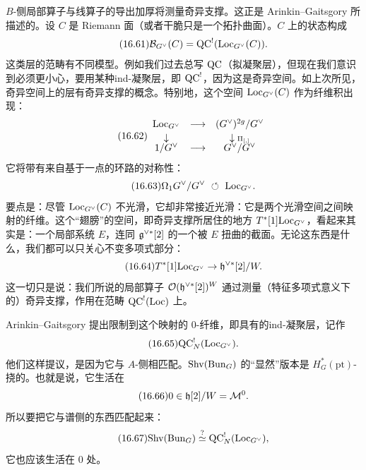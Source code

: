 $B$-侧局部算子与线算子的导出加厚将测量奇异支撑。这正是 Arinkin--Gaitsgory 所描述的。设 $C$ 是 Riemann 面（或者干脆只是一个拓扑曲面）。$C$ 上的状态构成
\begin{equation}\tag{16.61}
\mathcal{B}_{G^\vee}(C)=\mathrm{QC}^!(\mathrm{Loc}_{G^\vee}(C)).
\end{equation}
这类层的范畴有不同模型。例如我们过去总写 $\mathrm{QC}$（拟凝聚层），但现在我们意识到必须更小心，要用某种ind-凝聚层，即 $\mathrm{QC}^!$，因为这是奇异空间。如上次所见，奇异空间上的层有奇异支撑的概念。特别地，这个空间 $\mathrm{Loc}_{G^\vee}(C)$ 作为纤维积出现：
\begin{equation}\tag{16.62}
\begin{array}{ccc}
\mathrm{Loc}_{G^\vee} & \longrightarrow & (G^\vee)^{2g}/G^\vee\\[2pt]
\downarrow & & \downarrow{\scriptstyle\Pi_{[,]}}\\[-2pt]
1/G^\vee & \longrightarrow & G^\vee/G^\vee
\end{array}
\end{equation}
它将带有来自基于一点的环路的对称性：
\begin{equation}\tag{16.63}
\Omega_1G^\vee/G^\vee\ \circlearrowleft\ \mathrm{Loc}_{G^\vee}.
\end{equation}
要点是：尽管 $\mathrm{Loc}_{G^\vee}(C)$ 不光滑，它却非常接近光滑：它是两个光滑空间之间映射的纤维。这个“翅膀”的空间，即奇异支撑所居住的地方 $T^*[1]\mathrm{Loc}_{G^\vee}$，看起来其实是：一个局部系统 $E$，连同 $\mathfrak{g}^{\vee*}[2]$ 的一个被 $E$ 扭曲的截面。无论这东西是什么，我们都可以只关心不变多项式部分：
\begin{equation}\tag{16.64}
T^*[1]\mathrm{Loc}_{G^\vee}\to\mathfrak{h}^{\vee*}[2]/W.
\end{equation}
这一切只是说：我们所说的局部算子 $\mathcal{O}(\mathfrak{h}^{\vee*}[2])^W$ 通过测量（特征多项式意义下的）奇异支撑，作用在范畴 $\mathrm{QC}^!(\mathrm{Loc})$ 上。

Arinkin--Gaitsgory 提出限制到这个映射的 $0$-纤维，即具有的ind-凝聚层，记作
\begin{equation}\tag{16.65}
\mathrm{QC}^!_N(\mathrm{Loc}_{G^\vee}).
\end{equation}
他们这样提议，是因为它与 $A$-侧相匹配。$\mathrm{Shv}(\mathrm{Bun}_G)$ 的“显然”版本是 $H^*_G(\mathrm{pt})$-挠的。也就是说，它生活在
\begin{equation}\tag{16.66}
0\in\mathfrak{h}[2]/W=\mathcal{M}^0.
\end{equation}
所以要把它与谱侧的东西匹配起来：
\begin{equation}\tag{16.67}
\mathrm{Shv}(\mathrm{Bun}_G)\stackrel{?}{\simeq}\mathrm{QC}^!_N(\mathrm{Loc}_{G^\vee}),
\end{equation}
它也应该生活在 $0$ 处。

